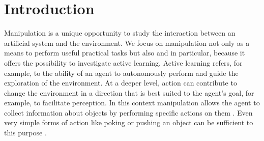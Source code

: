 \section{Introduction}
\label{sect:intro}
Manipulation is a unique opportunity to study the interaction between an artificial system and the environment. We focus on manipulation not only as a means to perform useful practical tasks but also and in particular, because it offers the possibility to investigate active learning. Active learning refers, for example, to the ability of an agent to autonomously perform and guide the exploration of the environment. At a deeper level, action can contribute to change the environment in a direction that is best suited to the agent's goal, for example, to facilitate perception. In this context manipulation allows the agent to collect information about objects by performing specific actions on them \cite{metta03early}. Even very simple forms of action like poking or pushing an object can be sufficient to this purpose \cite{fitzpatrick03learning}.

